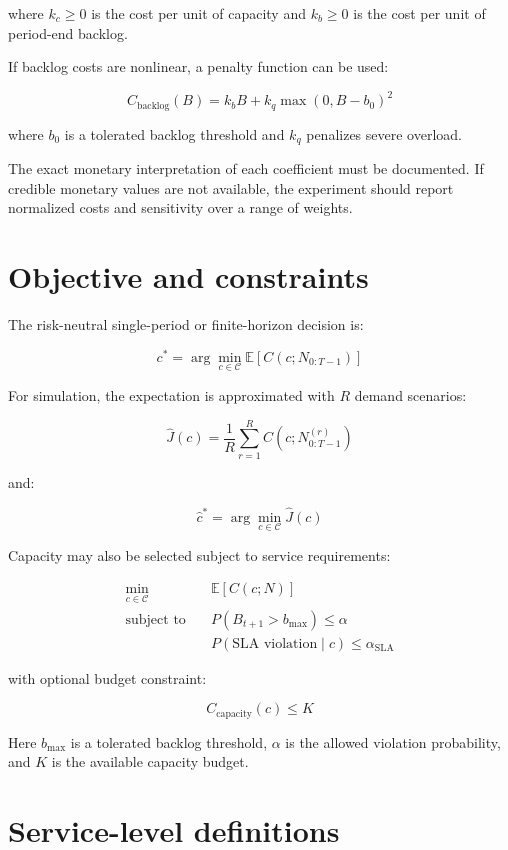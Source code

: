 \documentclass[11pt,a4paper]{article}
\newcommand{\equationnote}[1]{\begin{center}\colorbox{boxblue}{\parbox{0.92\linewidth}{\begin{equation*}#1\end{equation*}}}\end{center}}
\begin{document}
where $k_c \geq 0$ is the cost per unit of capacity and $k_b \geq 0$ is the cost per unit of period-end backlog.

If backlog costs are nonlinear, a penalty function can be used:

\equationnote{C_{\text{backlog}}(B) = k_b B + k_q \max(0, B-b_0)^2}

where $b_0$ is a tolerated backlog threshold and $k_q$ penalizes severe overload.

The exact monetary interpretation of each coefficient must be documented. If credible monetary values are not available, the experiment should report normalized costs and sensitivity over a range of weights.

\section{Objective and constraints}

The risk-neutral single-period or finite-horizon decision is:

\equationnote{c^* = \arg\min_{c \in \mathcal{C}} \mathbb{E}\left[C(c;N_{0:T-1})\right]}

For simulation, the expectation is approximated with $R$ demand scenarios:

\equationnote{\widehat{J}(c) = \frac{1}{R}\sum_{r=1}^{R} C\left(c;N_{0:T-1}^{(r)}\right)}

and:

\equationnote{\widehat{c}^* = \arg\min_{c \in \mathcal{C}} \widehat{J}(c)}

Capacity may also be selected subject to service requirements:

\equationnote{\begin{aligned}\min_{c \in \mathcal{C}}\quad & \mathbb{E}[C(c;N)]\\[2pt]\text{subject to}\quad & P(B_{t+1} > b_{\max}) \leq \alpha\\ & P(\text{SLA violation}\mid c) \leq \alpha_{\text{SLA}}\end{aligned}}

with optional budget constraint:

\equationnote{C_{\text{capacity}}(c) \leq K}

Here $b_{\max}$ is a tolerated backlog threshold, $\alpha$ is the allowed violation probability, and $K$ is the available capacity budget.

\section{Service-level definitions}
\end{document}
